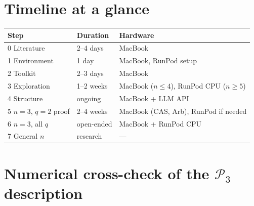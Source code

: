 \documentclass[11pt]{article}
\begin{document}
\section*{Timeline at a glance}
\begin{center}
\begin{tabular}{@{}lll@{}}
\toprule
Step & Duration & Hardware \\ \midrule
0 Literature & 2--4 days & MacBook \\
1 Environment & 1 day & MacBook, RunPod setup \\
2 Toolkit & 2--3 days & MacBook \\
3 Exploration & 1--2 weeks & MacBook ($n\le4$), RunPod CPU ($n\ge5$) \\
4 Structure & ongoing & MacBook + LLM API \\
5 $n=3$, $q=2$ proof & 2--4 weeks & MacBook (CAS, Arb), RunPod if needed \\
6 $n=3$, all $q$ & open-ended & MacBook + RunPod CPU \\
7 General $n$ & research & --- \\ \bottomrule
\end{tabular}
\end{center}

\appendix
\section{Numerical cross-check of the $\mathcal P_3$ description}

\end{document}
